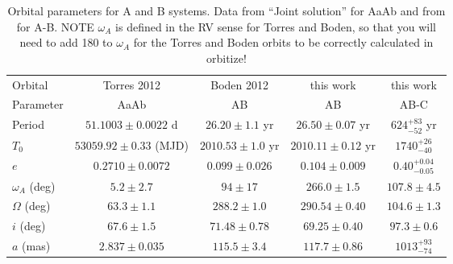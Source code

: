 \documentclass{aa}
\begin{document}
\begin{table*}
\caption{Orbital parameters for A and B systems. Data from \citet{Torres12} ``Joint solution'' for AaAb and from \citet{Boden12} for A-B. NOTE $\omega_A$ is defined in the RV sense for Torres and Boden, so that you will need to add 180\degr{} to $\omega_A$ for the Torres and Boden orbits to be correctly calculated in orbitize!}              %
\label{tab:orbs}      %
\centering                                      %
\begin{tabular}{l c c c c}          %
\hline\hline                        %
Orbital  & Torres 2012  & Boden 2012    & this work   &  this work \\
 Parameter & AaAb  & AB    & AB   & AB-C  \\

\hline                                   %
Period          & $51.1003\pm 0.0022$ d  & $26.20 \pm 1.1$  yr  &  $26.50  \pm 0.07$  yr  & $624_{-52}^{+83}$ yr\\
$T_0$           & $53059.92\pm 0.33$ (MJD) & $2010.53 \pm 1.0$ yr &  $2010.11\pm 0.12$  yr  & $1740_{-40}^{+26}$\\
$e$             & $0.2710\pm 0.0072$    & $0.099 \pm  0.026$ &  $0.104  \pm 0.009$    & $0.40_{-0.05}^{+0.04}$ \\
$\omega_A$ (deg)& $5.2\pm 2.7$          & $94 \pm 17$        &  $266.0 \pm 1.5$    & $107.8\pm 4.5$ \\
$\Omega$ (deg)  & $63.3\pm 1.1$         & $288.2 \pm 1.0$    &  $290.54 \pm 0.40$    & $104.6\pm 1.3$\\
$i$ (deg)       & $67.6\pm 1.5$         & $71.48 \pm 0.78$   &  $69.25 \pm 0.40 $    & $97.3\pm 0.6$\\
$a$ (mas)       & $2.837\pm 0.035$      & $115.5 \pm 3.4$    &  $117.7 \pm 0.86$    & $1013_{-74}^{+93}$\\
\hline                                             %
\end{tabular}
\end{table*}
\end{document}
